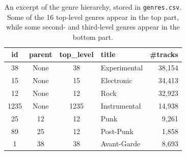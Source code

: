 \documentclass{article}
\begin{document}
\begin{table}
	\centering
	\begin{tabular}{ccclr}
		\toprule
		id & parent & top\_level & title & \#tracks \\
		\midrule
		38 & None & 38 & Experimental & 38,154 \\
		15 & None & 15 & Electronic & 34,413 \\
		12 & None & 12 & Rock & 32,923 \\
		1235 & None & 1235 & Instrumental & 14,938 \\
		\midrule
		25 & 12 & 12 & Punk & 9,261 \\
		89 & 25 & 12 & Post-Punk & 1,858 \\
		1  & 38 & 38 & Avant-Garde & 8,693 \\
		\bottomrule
	\end{tabular}
	\caption{An excerpt of the genre hierarchy, stored in \texttt{genres.csv}. Some of the 16 top-level genres appear in the top part, while some second- and third-level genres appear in the bottom part.}
	\label{tab:genres}
\end{table}
\end{document}
